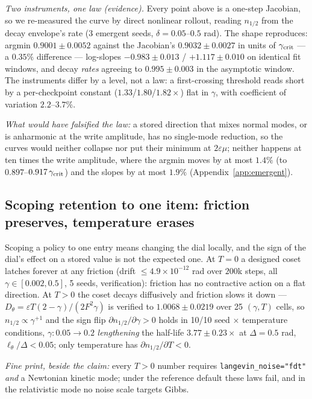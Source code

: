 \emph{Two instruments, one law (evidence).} Every point above is a one-step Jacobian, so we re-measured the curve by direct nonlinear rollout, reading $n_{1/2}$ from the decay envelope's rate (3 emergent seeds, $\delta=0.05$--$0.5$ rad). The shape reproduces: argmin $0.9001\pm0.0052$ against the Jacobian's $0.9032\pm0.0027$ in units of $\gamma_{\rm crit}$ --- a $0.35\%$ difference --- log-slopes $-0.983\pm0.013$ / $+1.117\pm0.010$ on identical fit windows, and decay \emph{rates} agreeing to $0.995\pm0.003$ in the asymptotic window. The instruments differ by a level, not a law: a first-crossing threshold reads short by a per-checkpoint constant ($1.33$/$1.80$/$1.82\times$) flat in $\gamma$, with coefficient of variation $2.2$--$3.7\%$. {\scriptsize\emph{What would have falsified the law:} a stored direction that mixes normal modes, or is anharmonic at the write amplitude, has no single-mode reduction, so the curves would neither collapse nor put their minimum at $2\varepsilon\mu$; neither happens at ten times the write amplitude, where the argmin moves by at most $1.4\%$ (to $0.897$--$0.917\,\gamma_{\rm crit}$) and the slopes by at most $1.9\%$ (Appendix~\ref{app:emergent}).\par}

\subsection{Scoping retention to one item: friction preserves, temperature erases}\label{sec:vault}

Scoping a policy to one entry means changing the dial locally, and the sign of the dial's effect on a stored value is not the expected one. At $T=0$ a designed coset latches forever at any friction (drift $\le4.9\times10^{-12}$ rad over $200$k steps, all $\gamma\in[0.002,0.5]$, 5 seeds, verification): friction has no contractive action on a flat direction. At $T>0$ the coset decays diffusively and friction slows it down --- $D_\theta=\varepsilon T(2-\gamma)/(2F^2\gamma)$ is verified to $1.0068\pm0.0219$ over 25 $(\gamma,T)$ cells, so $n_{1/2}\propto\gamma^{+1}$ and the sign flip $\partial n_{1/2}/\partial\gamma>0$ holds in 10/10 seed $\times$ temperature conditions, $\gamma:0.05\to0.2$ \emph{lengthening} the half-life $3.77\pm0.23\times$ at $\Delta=0.5$ rad, $\ell_\theta/\Delta<0.05$; only temperature has $\partial n_{1/2}/\partial T<0$. {\scriptsize\emph{Fine print, beside the claim:} every $T>0$ number requires \texttt{langevin\_noise="fdt"} \emph{and} a Newtonian kinetic mode; under the reference default these laws fail, and in the relativistic mode no noise scale targets Gibbs.\par}

